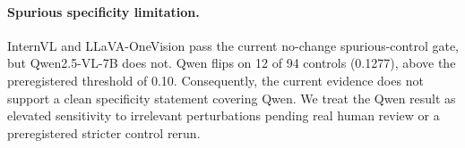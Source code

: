 
\paragraph{Spurious specificity limitation.}
InternVL and LLaVA-OneVision pass the current no-change spurious-control gate, but Qwen2.5-VL-7B does not. Qwen flips on 12 of 94 controls (0.1277), above the preregistered threshold of 0.10. Consequently, the current evidence does not support a clean specificity statement covering Qwen. We treat the Qwen result as elevated sensitivity to irrelevant perturbations pending real human review or a preregistered stricter control rerun.
